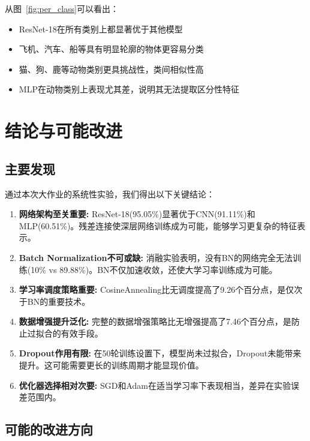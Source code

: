 \documentclass[12pt,a4paper]{article}
\begin{document}
从图~\ref{fig:per_class}可以看出：
\begin{itemize}[leftmargin=2em]
    \item ResNet-18在所有类别上都显著优于其他模型
    \item 飞机、汽车、船等具有明显轮廓的物体更容易分类
    \item 猫、狗、鹿等动物类别更具挑战性，类间相似性高
    \item MLP在动物类别上表现尤其差，说明其无法提取区分性特征
\end{itemize}

\section{结论与可能改进}

\subsection{主要发现}

通过本次大作业的系统性实验，我们得出以下关键结论：

\begin{enumerate}[leftmargin=2em]
    \item \textbf{网络架构至关重要:} ResNet-18(95.05\%)显著优于CNN(91.11\%)和MLP(60.51\%)。残差连接使深层网络训练成为可能，能够学习更复杂的特征表示。
    
    \item \textbf{Batch Normalization不可或缺:} 消融实验表明，没有BN的网络完全无法训练(10\% vs 89.88\%)。BN不仅加速收敛，还使大学习率训练成为可能。
    
    \item \textbf{学习率调度策略重要:} CosineAnnealing比无调度提高了9.26个百分点，是仅次于BN的重要技术。
    
    \item \textbf{数据增强提升泛化:} 完整的数据增强策略比无增强提高了7.46个百分点，是防止过拟合的有效手段。
    
    \item \textbf{Dropout作用有限:} 在50轮训练设置下，模型尚未过拟合，Dropout未能带来提升。这可能需要更长的训练周期才能显现价值。
    
    \item \textbf{优化器选择相对次要:} SGD和Adam在适当学习率下表现相当，差异在实验误差范围内。
\end{enumerate}

\subsection{可能的改进方向}
\end{document}
